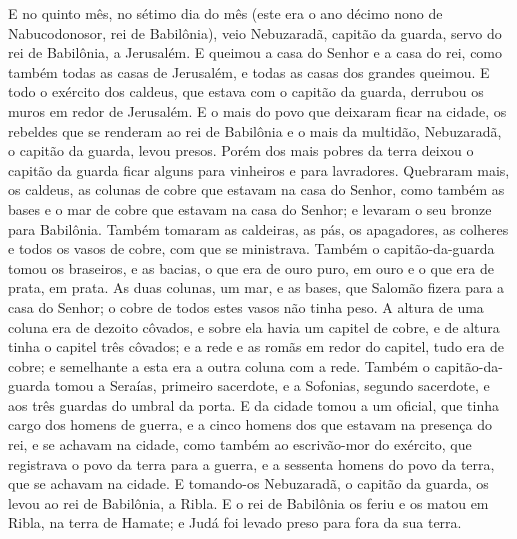 E no quinto mês, no sétimo dia do mês (este era o ano décimo nono
de Nabucodonosor, rei de Babilônia), veio Nebuzaradã, capitão da
guarda, servo do rei de Babilônia, a Jerusalém. E queimou a casa
do Senhor e a casa do rei, como também todas as casas de Jerusalém,
e todas as casas dos grandes queimou. E todo o exército dos
caldeus, que estava com o capitão da guarda, derrubou os muros em
redor de Jerusalém. E o mais do povo que deixaram ficar na
cidade, os rebeldes que se renderam ao rei de Babilônia e o mais da
multidão, Nebuzaradã, o capitão da guarda, levou presos.
Porém dos mais pobres da terra deixou o capitão da guarda
ficar alguns para vinheiros e para lavradores. Quebraram
mais, os caldeus, as colunas de cobre que estavam na casa do Senhor,
como também as bases e o mar de cobre que estavam na casa do Senhor;
e levaram o seu bronze para Babilônia. Também tomaram as
caldeiras, as pás, os apagadores, as colheres e todos os vasos de
cobre, com que se ministrava. Também o capitão-da-guarda
tomou os braseiros, e as bacias, o que era de ouro puro, em ouro e o
que era de prata, em prata. As duas colunas, um mar, e as
bases, que Salomão fizera para a casa do Senhor; o cobre de todos
estes vasos não tinha peso. A altura de uma coluna era de
dezoito côvados, e sobre ela havia um capitel de cobre, e de altura
tinha o capitel três côvados; e a rede e as romãs em redor do
capitel, tudo era de cobre; e semelhante a esta era a outra coluna
com a rede. Também o capitão-da-guarda tomou a Seraías,
primeiro sacerdote, e a Sofonias, segundo sacerdote, e aos três
guardas do umbral da porta. E da cidade tomou a um oficial,
que tinha cargo dos homens de guerra, e a cinco homens dos que
estavam na presença do rei, e se achavam na cidade, como também ao
escrivão-mor do exército, que registrava o povo da terra para a
guerra, e a sessenta homens do povo da terra, que se achavam na
cidade. E tomando-os Nebuzaradã, o capitão da guarda, os
levou ao rei de Babilônia, a Ribla. E o rei de Babilônia os
feriu e os matou em Ribla, na terra de Hamate; e Judá foi levado
preso para fora da sua terra.

